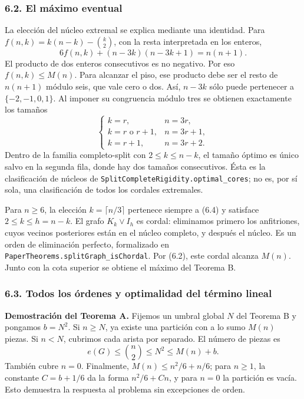 \documentclass[spanish,11pt,a4paper]{article}
\begin{document}
\subsubsection{6.2. El máximo eventual}\label{el-muxe1ximo-eventual}

La elección del núcleo extremal se explica mediante una identidad. Para \(f(n,k)=k(n-k)-\binom k2\), con la resta interpretada en los enteros, \[
6f(n,k)+(n-3k)(n-3k+1)=n(n+1).
\tag{6.3}
\] El producto de dos enteros consecutivos es no negativo. Por eso \(f(n,k)\le M(n)\). Para alcanzar el piso, ese producto debe ser el resto de \(n(n+1)\) módulo seis, que vale cero o dos. Así, \(n-3k\) sólo puede pertenecer a \(\{-2,-1,0,1\}\). Al imponer su congruencia módulo tres se obtienen exactamente los tamaños \[
\begin{cases}
k=r,& n=3r,\\
k=r\text{ o }r+1,& n=3r+1,\\
k=r+1,& n=3r+2.
\end{cases}
\tag{6.4}
\] Dentro de la familia completo-split con \(2\le k\le n-k\), el tamaño óptimo es único salvo en la segunda fila, donde hay dos tamaños consecutivos. Ésta es la clasificación de núcleos de \nolinkurl{SplitCompleteRigidity.optimal_cores}; no es, por sí sola, una clasificación de todos los cordales extremales.

Para \(n\ge6\), la elección \(k=\lceil n/3\rceil\) pertenece siempre a (6.4) y satisface \(2\le k\le h=n-k\). El grafo \(K_k\vee I_h\) es cordal: eliminamos primero los anfitriones, cuyos vecinos posteriores están en el núcleo completo, y después el núcleo. Es un orden de eliminación perfecto, formalizado en \nolinkurl{PaperTheorems.splitGraph_isChordal}. Por (6.2), este cordal alcanza \(M(n)\). Junto con la cota superior se obtiene el máximo del Teorema B.

\subsubsection{6.3. Todos los órdenes y optimalidad del término lineal}\label{todos-los-uxf3rdenes-y-optimalidad-del-tuxe9rmino-lineal}

\textbf{Demostración del Teorema A.} Fijemos un umbral global \(N\) del Teorema B y pongamos \(b=N^2\). Si \(n\ge N\), ya existe una partición con a lo sumo \(M(n)\) piezas. Si \(n<N\), cubrimos cada arista por separado. El número de piezas es \[
e(G)\le\binom n2\le N^2\le M(n)+b.
\] También cubre \(n=0\). Finalmente, \(M(n)\le n^2/6+n/6\); para \(n\ge1\), la constante \(C=b+1/6\) da la forma \(n^2/6+Cn\), y para \(n=0\) la partición es vacía. Esto demuestra la respuesta al problema sin excepciones de orden.
\end{document}
